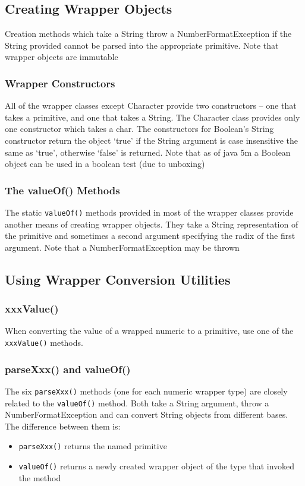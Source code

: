 \subsection{Creating Wrapper Objects}
Creation methods which take a String throw a NumberFormatException if the 
String provided cannot be parsed into the appropriate primitive. Note that 
wrapper objects are immutable

\subsubsection{Wrapper Constructors}
All of the wrapper classes except Character provide two constructors -- one 
that takes a primitive, and one that takes a String. The Character class 
provides only one constructor which takes a char. The constructors for 
Boolean's String constructor return the object `true' if the String argument is 
case insensitive the same as `true', otherwise `false' is returned. Note that 
as of java 5m a Boolean object can be used in a boolean test (due to unboxing)

\subsubsection{The valueOf() Methods}
The static \verb#valueOf()# methods provided in most of the wrapper classes 
provide another means of creating wrapper objects. They take a String 
representation of the primitive and sometimes a second argument specifying the 
radix of the first argument. Note that a NumberFormatException may be thrown

\subsection{Using Wrapper Conversion Utilities}
\subsubsection{xxxValue()}
When converting the value of a wrapped numeric to a primitive, use one of the
\verb#xxxValue()# methods. 

\subsubsection{parseXxx() and valueOf()}
The six \verb#parseXxx()# methods (one for each numeric wrapper type) are 
closely related to the \verb#valueOf()# method. Both take a String argument, 
throw a NumberFormatException and can convert String objects from different 
bases. The difference between them is:
\begin{itemize}
    \item \verb#parseXxx()# returns the named primitive
    \item \verb#valueOf()# returns a newly created wrapper object of the type 
    that invoked the method
\end{itemize}

